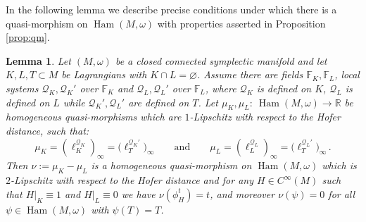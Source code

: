 \documentclass[11pt%
]{article}
\newtheorem{lemma}[thm]{Lemma}
\theoremstyle{definition}
\newcommand{\R}{{\mathbb{R}}}
\newcommand{\F}{{\mathbb{F}}}
\newcommand{\cQ}{{\mathcal{Q}}}
\newcommand{\fc}{{:\ }}
\DeclareMathOperator{\Ham}{Ham}
\DeclareMathOperator{\0}{\operatorname{\mathbf{0}}}
\begin{document}
In the following lemma we describe precise conditions under which there is a quasi-morphism on $\Ham(M,\omega)$ with properties asserted in Proposition \ref{prop:qm}.
\begin{lemma}
  Let $(M,\omega)$ be a closed connected symplectic manifold and let $K,L,T\subset M$ be Lagrangians with $K\cap L = \varnothing$. Assume there are fields $\F_K,\F_L$, local systems $\cQ_K, \cQ_K'$ over $\F_K$ and $\cQ_L,\cQ_L'$ over $\F_L$, where $\cQ_K$ is defined on $K$, $\cQ_L$ is defined on $L$ while $\cQ_K',\cQ_L'$ are defined on $T$. Let $\mu_K,\mu_L\fc\Ham(M,\omega) \to \R$ be homogeneous quasi-morphisms which are $1$-Lipschitz with respect to the Hofer distance, such that:
  $$\mu_K=(\ell^{\cQ_K}_K)_\infty=\big(\ell_T^{\cQ_K'}\big)_\infty\qquad \text{and} \qquad \mu_L=(\ell^{\cQ_L}_L)_\infty=\big(\ell_T^{\cQ_L'}\big)_\infty\,.$$
  Then $\nu:=\mu_K-\mu_L$ is a homogeneous quasi-morphism on $\Ham(M,\omega)$ which is $2$-Lipschitz with respect to the Hofer distance and for any $H\in C^\infty(M)$ such that $H|_K\equiv 1$ and $H|_L\equiv 0$ we have $\nu(\phi^t_H)=t$, and moreover $\nu(\psi) = 0$ for all $\psi \in \Ham(M,\omega)$ with $\psi(T) = T$.
\end{lemma}
\end{document}
